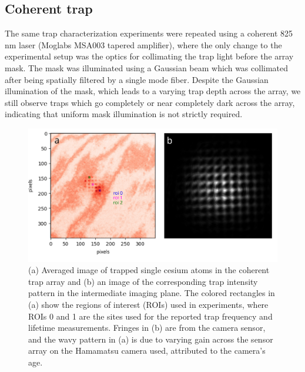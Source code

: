 \subsection{Coherent trap}\label{sub:coherent}
The same trap characterization experiments were repeated using a coherent 825 nm laser (Moglabs MSA003 tapered amplifier), where the only change to the experimental setup was the optics for collimating the trap light before the array mask. The mask was illuminated using a Gaussian beam which was collimated after being spatially filtered by a single mode fiber. Despite the Gaussian illumination of the mask, which leads to a varying trap depth across the array, we still observe traps which go completely or near completely dark across the array, indicating that uniform mask illumination is not  strictly required.

\begin{figure}[h]
    \centering
    \includegraphics[width=\textwidth]{Images/coherent_trap_intensity_and_atoms.pdf}
    \caption{(a) Averaged image of trapped single cesium atoms in the coherent trap array and (b) an image of the corresponding trap intensity pattern in the intermediate imaging plane. The colored rectangles in (a) show the regions of interest (ROIs) used in experiments, where ROIs 0 and 1 are the sites used for the reported trap frequency and lifetime measurements. Fringes in (b) are from the camera sensor, and the wavy pattern in (a) is due to varying gain across the sensor array on the Hamamatsu camera used,  attributed to the camera's age.}
    \label{fig:coherent_trap_and_atoms}
\end{figure}


